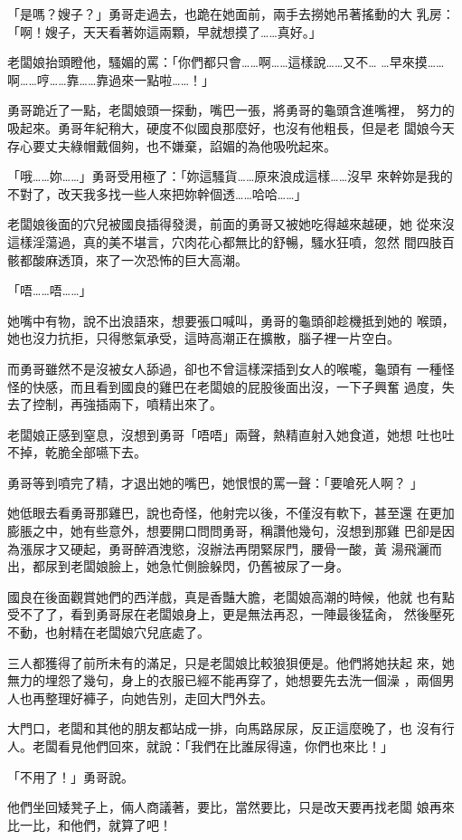 「是嗎？嫂子？」勇哥走過去，也跪在她面前，兩手去撈她吊著搖動的大
乳房：「啊！嫂子，天天看著妳這兩顆，早就想摸了……真好。」

老闆娘抬頭瞪他，騷媚的罵：「你們都只會……啊……這樣說……又不…
…早來摸……啊……哼……靠……靠過來一點啦……！」

勇哥跪近了一點，老闆娘頭一探動，嘴巴一張，將勇哥的龜頭含進嘴裡，
努力的吸起來。勇哥年紀稍大，硬度不似國良那麼好，也沒有他粗長，但是老
闆娘今天存心要丈夫綠帽戴個夠，也不嫌棄，諂媚的為他吸吮起來。

「哦……妳……」勇哥受用極了：「妳這騷貨……原來浪成這樣……沒早
來幹妳是我的不對了，改天我多找一些人來把妳幹個透……哈哈……」

老闆娘後面的穴兒被國良插得發燙，前面的勇哥又被她吃得越來越硬，她
從來沒這樣淫蕩過，真的美不堪言，穴肉花心都無比的舒暢，騷水狂噴，忽然
間四肢百骸都酸麻透頂，來了一次恐怖的巨大高潮。

「唔……唔……」

她嘴中有物，說不出浪語來，想要張口喊叫，勇哥的龜頭卻趁機抵到她的
喉頭，她也沒力抗拒，只得憋氣承受，這時高潮正在擴散，腦子裡一片空白。

而勇哥雖然不是沒被女人舔過，卻也不曾這樣深插到女人的喉嚨，龜頭有
一種怪怪的快感，而且看到國良的雞巴在老闆娘的屁股後面出沒，一下子興奮
過度，失去了控制，再強插兩下，噴精出來了。

老闆娘正感到窒息，沒想到勇哥「唔唔」兩聲，熱精直射入她食道，她想
吐也吐不掉，乾脆全部嚥下去。

勇哥等到噴完了精，才退出她的嘴巴，她恨恨的罵一聲：「要嗆死人啊？
」

她低眼去看勇哥那雞巴，說也奇怪，他射完以後，不僅沒有軟下，甚至還
在更加膨脹之中，她有些意外，想要開口問問勇哥，稱讚他幾句，沒想到那雞
巴卻是因為漲尿才又硬起，勇哥醉酒洩慾，沒辦法再閉緊尿門，腰骨一酸，黃
湯飛灑而出，都尿到老闆娘臉上，她急忙側臉躲閃，仍舊被尿了一身。

國良在後面觀賞她們的西洋戲，真是香豔大膽，老闆娘高潮的時候，他就
也有點受不了了，看到勇哥尿在老闆娘身上，更是無法再忍，一陣最後猛肏，
然後壓死不動，也射精在老闆娘穴兒底處了。

三人都獲得了前所未有的滿足，只是老闆娘比較狼狽便是。他們將她扶起
來，她無力的埋怨了幾句，身上的衣服已經不能再穿了，她想要先去洗一個澡
，兩個男人也再整理好褲子，向她告別，走回大門外去。

大門口，老闆和其他的朋友都站成一排，向馬路尿尿，反正這麼晚了，也
沒有行人。老闆看見他們回來，就說：「我們在比誰尿得遠，你們也來比！」

「不用了！」勇哥說。

他們坐回矮凳子上，倆人商議著，要比，當然要比，只是改天要再找老闆
娘再來比一比，和他們，就算了吧！










